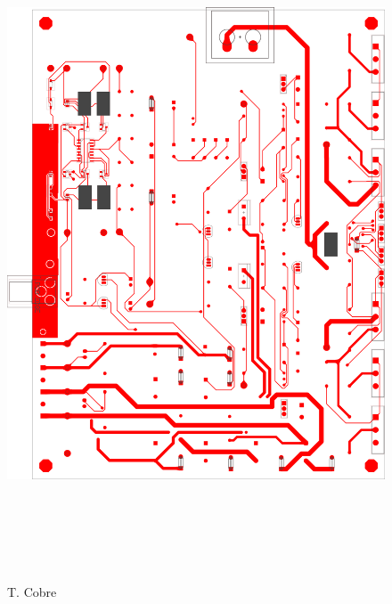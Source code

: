\begin{figure}[H]
    \centering
    \includegraphics[height=200mm, angle=0]{img/PCB/layers/amplifier/top-copper.png}
    \caption{\footnotesize{ T. Cobre }}
    \label{fig:pcb_amp_top_copper}
\end{figure}

\clearpage

